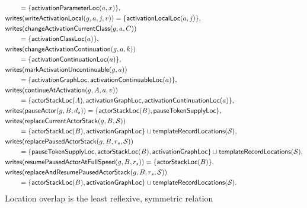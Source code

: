 {\begin{equation}
\begin{aligned}
 &\qquad=\{\mathsf{activationParameterLoc}(a,x)\},\\
 &\mathsf{writes}(\mathsf{writeActivationLocal}(g,a,j,v))
  =\{\mathsf{activationLocalLoc}(a,j)\},\\
 &\mathsf{writes}(\mathsf{changeActivationCurrentClass}(g,a,C))\\
 &\qquad=\{\mathsf{activationClassLoc}(a)\},\\
 &\mathsf{writes}(\mathsf{changeActivationContinuation}(g,a,k))\\
 &\qquad=\{\mathsf{activationContinuationLoc}(a)\},\\
 &\mathsf{writes}(\mathsf{markActivationUncontinuable}(g,a))\\
 &\qquad=\{\mathsf{activationGraphLoc},
       \mathsf{activationContinuableLoc}(a)\},\\
 &\mathsf{writes}(\mathsf{continueAtActivation}(g,A,a,v))\\
 &\qquad=\{\mathsf{actorStackLoc}(A),\mathsf{activationGraphLoc},
       \mathsf{activationContinuationLoc}(a)\},\\
 &\mathsf{writes}(\mathsf{pauseActor}(g,B,d_s))
   =\{\mathsf{actorStackLoc}(B),\mathsf{pauseTokenSupplyLoc}\},\\
 &\mathsf{writes}(\mathsf{replaceCurrentActorStack}(g,B,\mathcal S))\\
 &\qquad=\{\mathsf{actorStackLoc}(B),\mathsf{activationGraphLoc}\}\cup
      \mathsf{templateRecordLocations}(\mathcal S),\\
 &\mathsf{writes}(\mathsf{replacePausedActorStack}(g,B,r_s,\mathcal S))\\
 &\qquad=\{\mathsf{pauseTokenSupplyLoc},\mathsf{actorStackLoc}(B),
       \mathsf{activationGraphLoc}\}\cup
      \mathsf{templateRecordLocations}(\mathcal S),\\
 &\mathsf{writes}(\mathsf{resumePausedActorAtFullSpeed}(g,B,r_s))
   =\{\mathsf{actorStackLoc}(B)\},\\
 &\mathsf{writes}(\mathsf{replaceAndResumePausedActorStack}
        (g,B,r_s,\mathcal S))\\
 &\qquad=\{\mathsf{actorStackLoc}(B),\mathsf{activationGraphLoc}\}\cup
      \mathsf{templateRecordLocations}(\mathcal S).
\end{aligned}
\end{equation}
}
Location overlap is the least reflexive, symmetric relation
